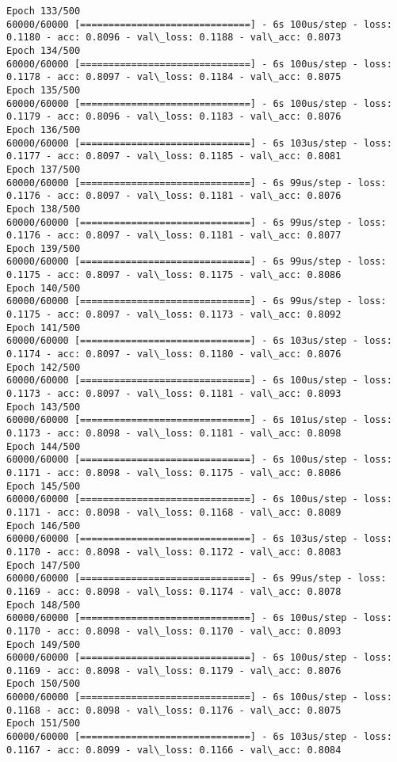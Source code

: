 \documentclass[11pt]{article}
\begin{document}
\begin{Verbatim}[commandchars=\\\{\}]
Epoch 133/500
60000/60000 [==============================] - 6s 100us/step - loss: 0.1180 - acc: 0.8096 - val\_loss: 0.1188 - val\_acc: 0.8073
Epoch 134/500
60000/60000 [==============================] - 6s 100us/step - loss: 0.1178 - acc: 0.8097 - val\_loss: 0.1184 - val\_acc: 0.8075
Epoch 135/500
60000/60000 [==============================] - 6s 100us/step - loss: 0.1179 - acc: 0.8096 - val\_loss: 0.1183 - val\_acc: 0.8076
Epoch 136/500
60000/60000 [==============================] - 6s 103us/step - loss: 0.1177 - acc: 0.8097 - val\_loss: 0.1185 - val\_acc: 0.8081
Epoch 137/500
60000/60000 [==============================] - 6s 99us/step - loss: 0.1176 - acc: 0.8097 - val\_loss: 0.1181 - val\_acc: 0.8076
Epoch 138/500
60000/60000 [==============================] - 6s 99us/step - loss: 0.1176 - acc: 0.8097 - val\_loss: 0.1181 - val\_acc: 0.8077
Epoch 139/500
60000/60000 [==============================] - 6s 99us/step - loss: 0.1175 - acc: 0.8097 - val\_loss: 0.1175 - val\_acc: 0.8086
Epoch 140/500
60000/60000 [==============================] - 6s 99us/step - loss: 0.1175 - acc: 0.8097 - val\_loss: 0.1173 - val\_acc: 0.8092
Epoch 141/500
60000/60000 [==============================] - 6s 103us/step - loss: 0.1174 - acc: 0.8097 - val\_loss: 0.1180 - val\_acc: 0.8076
Epoch 142/500
60000/60000 [==============================] - 6s 100us/step - loss: 0.1173 - acc: 0.8097 - val\_loss: 0.1181 - val\_acc: 0.8093
Epoch 143/500
60000/60000 [==============================] - 6s 101us/step - loss: 0.1173 - acc: 0.8098 - val\_loss: 0.1181 - val\_acc: 0.8098
Epoch 144/500
60000/60000 [==============================] - 6s 100us/step - loss: 0.1171 - acc: 0.8098 - val\_loss: 0.1175 - val\_acc: 0.8086
Epoch 145/500
60000/60000 [==============================] - 6s 100us/step - loss: 0.1171 - acc: 0.8098 - val\_loss: 0.1168 - val\_acc: 0.8089
Epoch 146/500
60000/60000 [==============================] - 6s 103us/step - loss: 0.1170 - acc: 0.8098 - val\_loss: 0.1172 - val\_acc: 0.8083
Epoch 147/500
60000/60000 [==============================] - 6s 99us/step - loss: 0.1169 - acc: 0.8098 - val\_loss: 0.1174 - val\_acc: 0.8078
Epoch 148/500
60000/60000 [==============================] - 6s 100us/step - loss: 0.1170 - acc: 0.8098 - val\_loss: 0.1170 - val\_acc: 0.8093
Epoch 149/500
60000/60000 [==============================] - 6s 100us/step - loss: 0.1169 - acc: 0.8098 - val\_loss: 0.1179 - val\_acc: 0.8076
Epoch 150/500
60000/60000 [==============================] - 6s 100us/step - loss: 0.1168 - acc: 0.8098 - val\_loss: 0.1176 - val\_acc: 0.8075
Epoch 151/500
60000/60000 [==============================] - 6s 103us/step - loss: 0.1167 - acc: 0.8099 - val\_loss: 0.1166 - val\_acc: 0.8084

\end{Verbatim}
\end{document}

